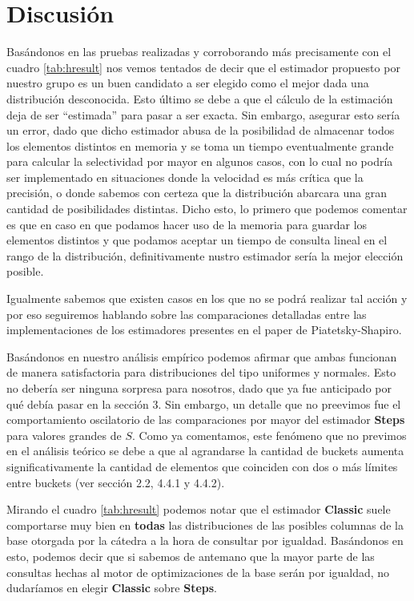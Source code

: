 \section{Discusión}
Basándonos en las pruebas realizadas y corroborando más precisamente con el cuadro \ref{tab:hresult} nos vemos tentados de decir que el estimador propuesto por nuestro grupo es un buen candidato a ser elegido como el mejor dada una distribución desconocida. Esto último se debe a que el cálculo de la estimación deja de ser ``estimada'' para pasar a ser exacta. Sin embargo, asegurar esto sería un error, dado que dicho estimador abusa de la posibilidad de almacenar todos los elementos distintos en memoria y se toma un tiempo eventualmente grande para calcular la selectividad por mayor en algunos casos, con lo cual no podría ser implementado en situaciones donde la velocidad es más crítica que la precisión, o donde sabemos con certeza que la distribución abarcara una gran cantidad de posibilidades distintas. Dicho esto, lo primero que podemos comentar es que en caso en que podamos hacer uso de la memoria para guardar los elementos distintos y que podamos aceptar un tiempo de consulta lineal en el rango de la distribución, definitivamente nustro estimador sería la mejor elección posible.

Igualmente sabemos que existen casos en los que no se podrá realizar tal acción y por eso seguiremos hablando sobre las comparaciones detalladas entre las implementaciones de los estimadores presentes en el paper de Piatetsky-Shapiro.

Basándonos en nuestro análisis empírico podemos afirmar que ambas funcionan de manera satisfactoria para distribuciones del tipo uniformes y normales. Esto no debería ser ninguna sorpresa para nosotros, dado que ya fue anticipado por qué debía pasar en la sección 3. Sin embargo, un detalle que no preevimos fue el comportamiento oscilatorio de las comparaciones por mayor del estimador \textbf{Steps} para valores grandes de $S$. Como ya comentamos, este fenómeno que no previmos en el análisis teórico se debe a que al agrandarse la cantidad de buckets aumenta significativamente la cantidad de elementos que coinciden con dos o más límites entre buckets (ver sección 2.2, 4.4.1 y 4.4.2).

Mirando el cuadro \ref{tab:hresult} podemos notar que el estimador \textbf{Classic} suele comportarse muy bien en \textbf{todas} las distribuciones de las posibles columnas de la base otorgada por la cátedra a la hora de consultar por igualdad. Basándonos en esto, podemos decir que si sabemos de antemano que la mayor parte de las consultas hechas al motor de optimizaciones de la base serán por igualdad, no dudaríamos en elegir \textbf{Classic} sobre \textbf{Steps}.

